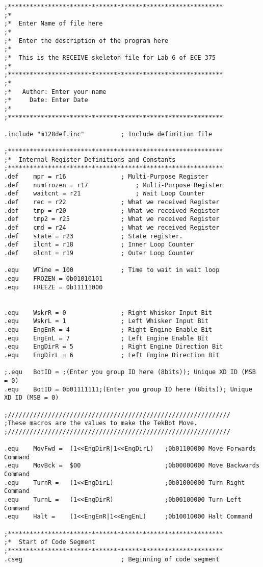 \documentclass[12pt,letterpaper]{article}
\begin{document}
\begin{verbatim}
;***********************************************************
;*
;*	Enter Name of file here
;*
;*	Enter the description of the program here
;*
;*	This is the RECEIVE skeleton file for Lab 6 of ECE 375
;*
;***********************************************************
;*
;*	 Author: Enter your name
;*	   Date: Enter Date
;*
;***********************************************************

.include "m128def.inc"			; Include definition file

;***********************************************************
;*	Internal Register Definitions and Constants
;***********************************************************
.def	mpr = r16				; Multi-Purpose Register
.def	numFrozen = r17				; Multi-Purpose Register
.def	waitcnt = r21				; Wait Loop Counter
.def	rec = r22				; What we received Register
.def	tmp = r20				; What we received Register
.def	tmp2 = r25				; What we received Register
.def	cmd = r24				; What we received Register
.def	state = r23				; State register.
.def	ilcnt = r18				; Inner Loop Counter
.def	olcnt = r19				; Outer Loop Counter

.equ	WTime = 100				; Time to wait in wait loop
.equ    FROZEN = 0b01010101
.equ    FREEZE = 0b11111000


.equ	WskrR = 0				; Right Whisker Input Bit
.equ	WskrL = 1				; Left Whisker Input Bit
.equ	EngEnR = 4				; Right Engine Enable Bit
.equ	EngEnL = 7				; Left Engine Enable Bit
.equ	EngDirR = 5				; Right Engine Direction Bit
.equ	EngDirL = 6				; Left Engine Direction Bit

;.equ	BotID = ;(Enter you group ID here (8bits)); Unique XD ID (MSB = 0)
.equ	BotID = 0b01111111;(Enter you group ID here (8bits)); Unique XD ID (MSB = 0)

;/////////////////////////////////////////////////////////////
;These macros are the values to make the TekBot Move.
;/////////////////////////////////////////////////////////////

.equ	MovFwd =  (1<<EngDirR|1<<EngDirL)	;0b01100000 Move Forwards Command
.equ	MovBck =  $00						;0b00000000 Move Backwards Command
.equ	TurnR =   (1<<EngDirL)				;0b01000000 Turn Right Command
.equ	TurnL =   (1<<EngDirR)				;0b00100000 Turn Left Command
.equ	Halt =    (1<<EngEnR|1<<EngEnL)		;0b10010000 Halt Command

;***********************************************************
;*	Start of Code Segment
;***********************************************************
.cseg							; Beginning of code segment


\end{verbatim}
\end{document}
